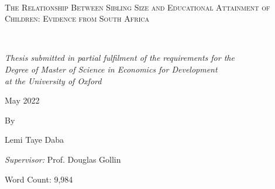 \begin{titlepage}
	\centering
	\vspace*{1.5cm}
	\hrulefill\\
	\vspace{0.5cm}
	{\scshape\LARGE The Relationship Between Sibling Size and Educational Attainment of Children: Evidence from South Africa\par}
	\vspace{0.5cm}
	\hrulefill\\
	\vspace{1.5cm}

	{\normalsize\itshape Thesis submitted in partial fulfilment of the requirements for the\\
Degree of Master of Science in Economics for Development\\
at the University of Oxford\par}
	
	\vspace{0.6cm}

	\vspace{2.8cm}
	{\normalsize May 2022 \par}
	
	
	\vspace{1.2cm}
	{\normalsize By \par}
	
	\vspace{1.2cm}
	{\large Lemi Taye Daba}

	\vspace{1cm}
	{\large\textit{Supervisor:} Prof. Douglas Gollin}
	
	
	\vspace{2.5cm}
	{\normalsize Word Count: 9,984}


\end{titlepage}